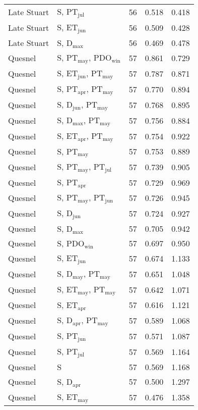 \begin{longtable}{llrrr}
Late Stuart & S, PT$_\mathrm{jul}$ & 56 & 0.518 & 0.418 \\ 
Late Stuart & S, ET$_\mathrm{jun}$ & 56 & 0.509 & 0.428 \\ 
Late Stuart & S, D$_\mathrm{max}$ & 56 & 0.469 & 0.478 \\ 
Quesnel & S, PT$_\mathrm{may}$, PDO$_\mathrm{win}$ & 57 & 0.861 & 0.729 \\ 
Quesnel & S, ET$_\mathrm{jun}$, PT$_\mathrm{may}$ & 57 & 0.787 & 0.871 \\ 
Quesnel & S, PT$_\mathrm{apr}$, PT$_\mathrm{may}$ & 57 & 0.770 & 0.894 \\ 
Quesnel & S, D$_\mathrm{jun}$, PT$_\mathrm{may}$ & 57 & 0.768 & 0.895 \\ 
Quesnel & S, D$_\mathrm{max}$, PT$_\mathrm{may}$ & 57 & 0.756 & 0.884 \\ 
Quesnel & S, ET$_\mathrm{apr}$, PT$_\mathrm{may}$ & 57 & 0.754 & 0.922 \\ 
Quesnel & S, PT$_\mathrm{may}$ & 57 & 0.753 & 0.889 \\ 
Quesnel & S, PT$_\mathrm{may}$, PT$_\mathrm{jul}$ & 57 & 0.739 & 0.905 \\ 
Quesnel & S, PT$_\mathrm{apr}$ & 57 & 0.729 & 0.969 \\ 
Quesnel & S, PT$_\mathrm{may}$, PT$_\mathrm{jun}$ & 57 & 0.726 & 0.945 \\ 
Quesnel & S, D$_\mathrm{jun}$ & 57 & 0.724 & 0.927 \\ 
Quesnel & S, D$_\mathrm{max}$ & 57 & 0.705 & 0.942 \\ 
Quesnel & S, PDO$_\mathrm{win}$ & 57 & 0.697 & 0.950 \\ 
Quesnel & S, ET$_\mathrm{jun}$ & 57 & 0.674 & 1.133 \\ 
Quesnel & S, D$_\mathrm{may}$, PT$_\mathrm{may}$ & 57 & 0.651 & 1.048 \\ 
Quesnel & S, ET$_\mathrm{may}$, PT$_\mathrm{may}$ & 57 & 0.642 & 1.071 \\ 
Quesnel & S, ET$_\mathrm{apr}$ & 57 & 0.616 & 1.121 \\ 
Quesnel & S, D$_\mathrm{apr}$, PT$_\mathrm{may}$ & 57 & 0.589 & 1.068 \\ 
Quesnel & S, PT$_\mathrm{jun}$ & 57 & 0.571 & 1.087 \\ 
Quesnel & S, PT$_\mathrm{jul}$ & 57 & 0.569 & 1.164 \\ 
Quesnel & S & 57 & 0.569 & 1.168 \\
Quesnel & S, D$_\mathrm{apr}$ & 57 & 0.500 & 1.297 \\ 
Quesnel & S, ET$_\mathrm{may}$ & 57 & 0.476 & 1.358 \\ 

\end{longtable}
